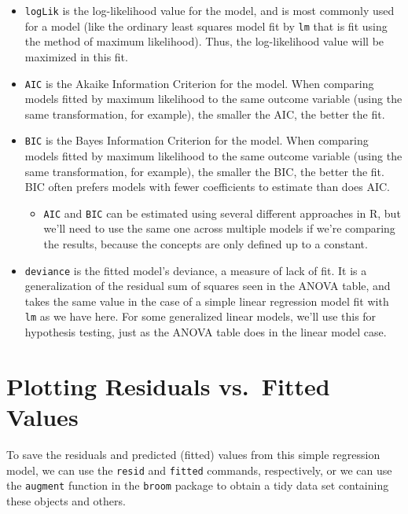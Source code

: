 \documentclass[
]{book}
\providecommand{\tightlist}{%
  \setlength{\itemsep}{0pt}\setlength{\parskip}{0pt}}
\begin{document}
\begin{itemize}
\tightlist
\item
  \texttt{logLik} is the log-likelihood value for the model, and is most commonly used for a model (like the ordinary least squares model fit by \texttt{lm} that is fit using the method of maximum likelihood). Thus, the log-likelihood value will be maximized in this fit.
\item
  \texttt{AIC} is the Akaike Information Criterion for the model. When comparing models fitted by maximum likelihood to the same outcome variable (using the same transformation, for example), the smaller the AIC, the better the fit.
\item
  \texttt{BIC} is the Bayes Information Criterion for the model. When comparing models fitted by maximum likelihood to the same outcome variable (using the same transformation, for example), the smaller the BIC, the better the fit. BIC often prefers models with fewer coefficients to estimate than does AIC.

  \begin{itemize}
  \tightlist
  \item
    \texttt{AIC} and \texttt{BIC} can be estimated using several different approaches in R, but we'll need to use the same one across multiple models if we're comparing the results, because the concepts are only defined up to a constant.
  \end{itemize}
\item
  \texttt{deviance} is the fitted model's deviance, a measure of lack of fit. It is a generalization of the residual sum of squares seen in the ANOVA table, and takes the same value in the case of a simple linear regression model fit with \texttt{lm} as we have here. For some generalized linear models, we'll use this for hypothesis testing, just as the ANOVA table does in the linear model case.
\end{itemize}

\hypertarget{plotting-residuals-vs.-fitted-values}{%
\section{Plotting Residuals vs.~Fitted Values}\label{plotting-residuals-vs.-fitted-values}}

To save the residuals and predicted (fitted) values from this simple regression model, we can use the \texttt{resid} and \texttt{fitted} commands, respectively, or we can use the \texttt{augment} function in the \texttt{broom} package to obtain a tidy data set containing these objects and others.
\end{document}
